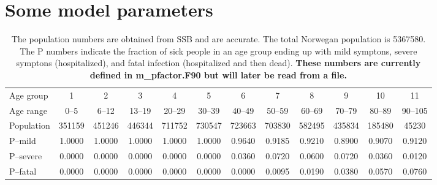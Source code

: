 \documentclass[twoside,11pt]{article}
\begin{document}
\clearpage
\newpage
\section{Some model parameters}
\begin{table}[htb]
\begin{center}
\small
\tabcolsep=3.5pt
\begin{tabular}{lccccccccccc}
\hline
 Age group & 1      & 2      & 3      & 4      & 5      & 6      & 7      & 8      & 9      & 10     & 11      \\
 Age range & 0--5   & 6--12  & 13--19 & 20--29 & 30--39 & 40--49 & 50--59 & 60--69 & 70--79 & 80--89 & 90--105 \\
 Population& 351159 & 451246 & 446344 & 711752 & 730547 & 723663 & 703830 & 582495 & 435834 & 185480 & 45230   \\
 P--mild   & 1.0000 & 1.0000 & 1.0000 & 1.0000 & 1.0000 & 0.9640 & 0.9185 & 0.9210 & 0.8900 & 0.9070 &  0.9120 \\
 P--severe & 0.0000 & 0.0000 & 0.0000 & 0.0000 & 0.0000 & 0.0360 & 0.0720 & 0.0600 & 0.0720 & 0.0360 &  0.0120 \\
 P--fatal  & 0.0000 & 0.0000 & 0.0000 & 0.0000 & 0.0000 & 0.0000 & 0.0095 & 0.0190 & 0.0380 & 0.0570 &  0.0760 \\
\hline
\end{tabular}
\end{center}
\caption{
The population numbers are obtained from SSB and are accurate. The total Norwegan population is 5367580.
The P numbers indicate the fraction of sick people in an age group ending up with mild symptons, severe symptons (hospitalized),
and fatal infection (hospitalized and then dead).
\textbf{These numbers are currently defined in m\_pfactor.F90 but will later be read from a file.}
\label{tab:age}}
\end{table}
%
\end{document}
